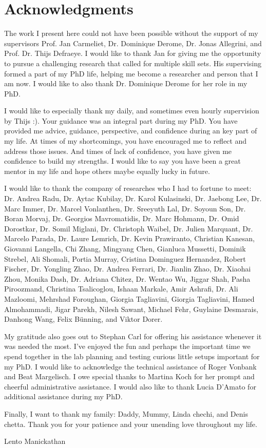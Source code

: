 \chapter{Acknowledgments}

The work I present here could not have been possible without the support of my supervisors Prof. Jan Carmeliet, Dr. Dominique Derome, Dr. Jonas Allegrini, and Prof. Dr. Thijs Defraeye. I would like to thank Jan for giving me the opportunity to pursue a challenging research that called for multiple skill sets. His supervising formed a part of my PhD life, helping me become a researcher and person that I am now. I would like to also thank Dr. Dominique Derome for her role in my PhD. 

I would like to especially thank my daily, and sometimes even hourly supervision by Thijs :). Your guidance was an integral part during my PhD. You have provided me advice, guidance, perspective, and confidence during an key part of my life. At times of my shortcomings, you have encouraged me to reflect and address those issues. And times of lack of confidence, you have given me confidence to build my strengths. I would like to say you have been a great mentor in my life and hope others maybe equally lucky in future. 

I would like to thank the company of researches who I had to fortune to meet: Dr. Andrea Radu, Dr. Aytac Kubilay, Dr. Karol Kulasinski, Dr. Jaebong Lee, Dr. Marc Immer, Dr. Marcel Vonlanthen, Dr. Sreeyuth Lal, Dr. Soyoun Son, Dr. Boran Morvaj, Dr. Georgios Mavromatidis, Dr. Marc Hohmann, Dr. Omid Dorostkar, Dr. Somil Miglani, Dr. Christoph Waibel, Dr. Julien Marquant, Dr. Marcelo Parada, Dr. Laure Lemrich, Dr. Kevin Prawiranto, Christian Kanesan, Giovanni Langella, Chi Zhang, Mingyang Chen, Gianluca Mussetti, Dominik Strebel, Ali Shomali, Portia Murray, Cristina Dominguez Hernandez, Robert Fischer, Dr. Yongling Zhao, Dr. Andrea Ferrari, Dr. Jianlin Zhao, Dr. Xiaohai Zhou, Monika Dash, Dr. Adriana Chitez, Dr. Wentao Wu, Jiggar Shah, Pasha Piroozmand, Christina Tsalicoglou, Ishaan Markale, Amir Ashrafi, Dr. Ali Mazloomi, Mehrshad Foroughan, Giorgia Tagliavini, Giorgia Tagliavini, Hamed Almohammadi, Jigar Parekh, Nilesh Sawant, Michael Fehr, Guylaine Desmarais, Danhong Wang, Felix B\"unning, and Viktor Dorer. 

My gratitude also goes out to Stephan Carl for offering his assistance whenever it was needed the most. I've enjoyed the fun and perhaps the important time we spend together in the lab planning and testing curious little setups important for my PhD. I would like to acknowledge the technical assistance of Roger Vonbank and Beat Margelisch. I owe special thanks to Martina Koch for her prompt and cheerful administrative assistance. I would also like to thank Lucia D'Amato for additional assistance during my PhD.

Finally, I want to thank my family: Daddy, Mummy, Linda chechi, and Denis chetta. Thank you for your patience and your unending love throughout my life.

\begin{flushright}
Lento Manickathan\\
\myMonthYear
\end{flushright}
